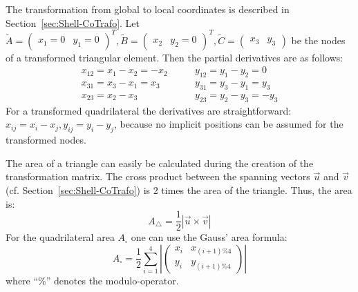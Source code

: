    The transformation from global to local coordinates is described in Section~\ref{sec:Shell-CoTrafo}. Let $\tilde{A} = \begin{pmatrix}
   x_1=0 & y_1=0
   \end{pmatrix}^T, \tilde{B} = \begin{pmatrix}
   x_2 & y_2=0
   \end{pmatrix}^T, \tilde{C} = \begin{pmatrix}
   x_3 & y_3
   \end{pmatrix}$ be the nodes of a transformed triangular element. Then the partial derivatives are as follows:
   \begin{align*}
   x_{12} = x_1 - x_2 = -x_2 &\qquad y_{12} = y_1 - y_2 = 0\\
   x_{31} = x_3 - x_1 = x_3  &\qquad y_{31} = y_3 - y_1 = y_3\\
   x_{23} = x_2 - x_3        &\qquad y_{23} = y_2 - y_3 = -y_3
   \end{align*}
   For a transformed quadrilateral the derivatives are straightforward: $x_{ij} = x_i - x_j, y_{ij} = y_i - y_j$, because no implicit positions can be assumed for the transformed nodes.
   
   The area of a triangle can easily be calculated during the creation of the transformation matrix. The cross product between the spanning vectors $\vec{u}$ and $\vec{v}$ (cf. Section~\ref{sec:Shell-CoTrafo}) is 2 times the area of the triangle. Thus, the area is:
   \begin{equation*}
   A_\triangle = \frac{1}{2} \left|\vec{u} \times \vec{v}\right|
   \end{equation*}
   For the quadrilateral area $A_\square$ one can use the Gauss' area formula:
   \begin{equation*}
   A_\square = \frac{1}{2} \sum_{i=1}^{4} \left|\begin{pmatrix}
   x_i & x_{(i+1)\%4}\\
   y_i & y_{(i+1)\%4}
   \end{pmatrix}\right|
   \end{equation*}
   where ``\%'' denotes the modulo-operator.
   
